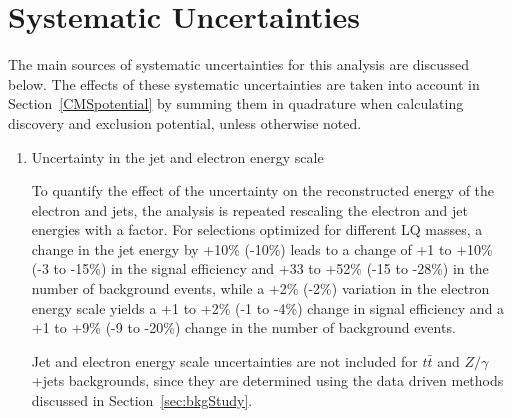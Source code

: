 %

\section{Systematic Uncertainties} \label{sec:Systematics}

The main sources of systematic uncertainties for this analysis are discussed below.
The effects of these systematic uncertainties are taken into account in Section~\ref{CMSpotential} 
by summing them in quadrature when calculating discovery and exclusion potential, unless otherwise noted.
%
\begin{enumerate}
\item Uncertainty in the jet and electron energy scale

To quantify the effect of the uncertainty on the reconstructed energy of the electron and jets,
the analysis is repeated rescaling the electron and jet energies
 with a factor. 
For selections optimized for different LQ masses, a change in the jet energy by +10\% (-10\%) leads 
to a change of +1 to +10\% (-3 to -15\%) in the signal efficiency and +33 to +52\% (-15 to -28\%) in the number of background events, 
while a +2\% (-2\%) variation in the electron energy scale yields a +1 to +2\% (-1 to -4\%) 
change in signal efficiency and a +1 to +9\% (-9 to -20\%) change in the number of background events. 

Jet and electron energy scale uncertainties
are not included for $t\bar{t}$ and $Z/\gamma$+jets backgrounds,
since they are determined using the data driven methods discussed
in Section~\ref{sec:bkgStudy}.



\end{enumerate}
